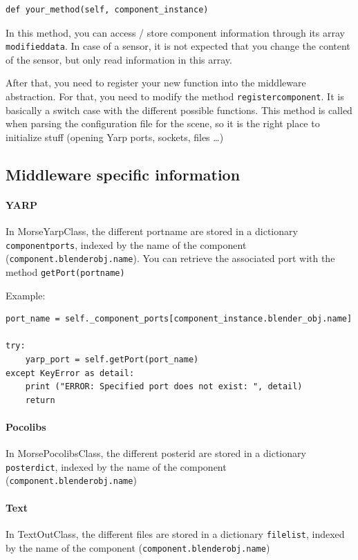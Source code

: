 \documentclass[twoside,a4paper,10pt]{report}
\newcommand{\dokutitleleveltree}[1]{\subsection{#1}}
\newcommand{\dokutitlelevelfive}[1]{\paragraph{#1}}
\newcommand{\dokumonospace}[1]{\texttt{#1}}
\begin{document}
\lstset{language=python}
\begin{lstlisting}
def your_method(self, component_instance)

\end{lstlisting}
In this method, you can access / store component information through its array
\dokumonospace{modified{\textunderscore}data}. In case of a sensor, it is not expected that you change the
content of the sensor, but only read information in this array.

After that, you need to register your new function into the middleware
abstraction.  For that, you need to modify the method \dokumonospace{register{\textunderscore}component}.
It is basically a switch case with the different possible functions. This
method is called when parsing the configuration file for the scene, so
it is the right place to initialize stuff (opening Yarp ports, sockets, files
\ldots{})


\dokutitleleveltree{Middleware specific information}
\label{908d8d85012025682a1a1a2659804af7}%

\dokutitlelevelfive{YARP}

In MorseYarpClass, the different port{\textunderscore}name are stored in a dictionary
\dokumonospace{{\textunderscore}component{\textunderscore}ports}, indexed by the name of the component
(\dokumonospace{component.blender{\textunderscore}obj.name}). You can retrieve the associated port with the method \dokumonospace{getPort(port{\textunderscore}name)}

Example:



\lstset{language=python}
\begin{lstlisting}
port_name = self._component_ports[component_instance.blender_obj.name]

try:
	yarp_port = self.getPort(port_name)
except KeyError as detail:
	print ("ERROR: Specified port does not exist: ", detail)
	return

\end{lstlisting}

\dokutitlelevelfive{Pocolibs}

In MorsePocolibsClass, the different poster{\textunderscore}id are stored in a dictionary
\dokumonospace{{\textunderscore}poster{\textunderscore}dict}, indexed by the name of the component
(\dokumonospace{component.blender{\textunderscore}obj.name})


\dokutitlelevelfive{Text}

In TextOutClass, the different files are stored in a dictionary
\dokumonospace{{\textunderscore}file{\textunderscore}list}, indexed by the name of the component
(\dokumonospace{component.blender{\textunderscore}obj.name})
\end{document}
